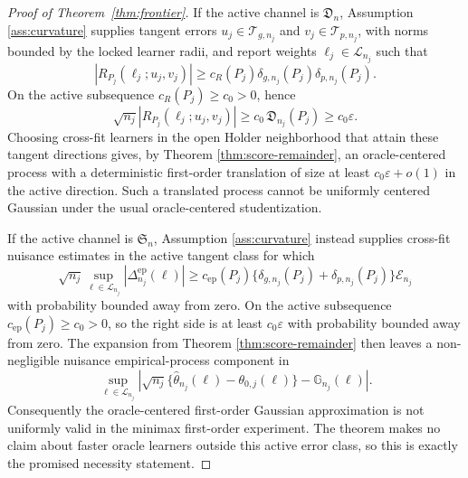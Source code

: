 \documentclass[11pt]{article}
\theoremstyle{definition}
\theoremstyle{plain}
\theoremstyle{remark}
\begin{document}
\begin{proof}[Proof of Theorem~\ref{thm:frontier}]
If the active channel is \(\mathfrak{D}_n\), Assumption
\ref{ass:curvature} supplies tangent errors \(u_j\in\mathcal{T}_{g,n_j}\) and
\(v_j\in\mathcal{T}_{p,n_j}\), with norms bounded by the locked learner radii,
and report weights \(\ell_j\in\mathcal{L}_{n_j}\) such that
\[
|R_{P_j}(\ell_j;u_j,v_j)|
\ge c_R(P_j)\delta_{g,n_j}(P_j)\delta_{p,n_j}(P_j).
\]
On the active subsequence \(c_R(P_j)\ge c_0>0\), hence
\[
\sqrt{n_j}|R_{P_j}(\ell_j;u_j,v_j)|
\ge c_0\,\mathfrak{D}_{n_j}(P_j)
\ge c_0\varepsilon .
\]
Choosing cross-fit learners in the open Holder neighborhood that attain these
tangent directions gives, by Theorem \ref{thm:score-remainder}, an
oracle-centered process with a deterministic first-order translation of size at
least \(c_0\varepsilon+o(1)\) in the active direction.  Such a translated
process cannot be uniformly centered Gaussian under the usual
oracle-centered studentization.

If the active channel is \(\mathfrak{S}_n\), Assumption
\ref{ass:curvature} instead supplies cross-fit nuisance estimates in the
active tangent class for which
\[
\sqrt{n_j}\sup_{\ell\in\mathcal{L}_{n_j}}
|\Delta^{\mathrm{ep}}_{n_j}(\ell)|
\ge c_{\mathrm{ep}}(P_j)
\{\delta_{g,n_j}(P_j)+\delta_{p,n_j}(P_j)\}\mathcal{E}_{n_j}
\]
with probability bounded away from zero.  On the active subsequence
\(c_{\mathrm{ep}}(P_j)\ge c_0>0\), so the right side is at least
\(c_0\varepsilon\) with probability bounded away from zero.  The expansion from
Theorem \ref{thm:score-remainder} then leaves a non-negligible nuisance
empirical-process component in
\[
\sup_{\ell\in\mathcal{L}_{n_j}}
\left|\sqrt{n_j}\{\hat\theta_{n_j}(\ell)-\theta_{0,j}(\ell)\}
-\mathbb{G}_{n_j}(\ell)\right|.
\]
Consequently the oracle-centered first-order Gaussian approximation is not
uniformly valid in the minimax first-order experiment.  The theorem makes no
claim about faster oracle learners outside this active error class, so this is
exactly the promised necessity statement.
\end{proof}
\end{document}

